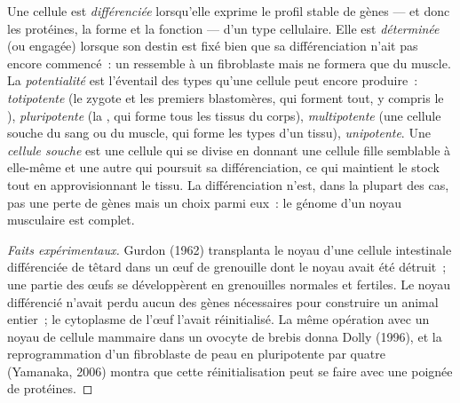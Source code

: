 \begin{definition}\label{def:b2:cell-differentiation:differentiation}
Une cellule est \emph{différenciée} lorsqu'elle exprime le profil stable
de gènes --- et donc les protéines, la forme et la fonction --- d'un type
cellulaire. Elle est \emph{déterminée} (ou engagée) lorsque son destin
est fixé bien que sa différenciation n'ait pas encore commencé~: un
 ressemble à un fibroblaste mais ne formera que du muscle. La
\emph{potentialité} est l'éventail des types qu'une cellule peut encore
produire~: \emph{totipotente} (le zygote et les premiers blastomères,
qui forment tout, y compris le ), \emph{pluripotente} (la , qui forme tous les tissus du corps),
\emph{multipotente} (une cellule souche du sang ou du muscle, qui forme
les types d'un tissu), \emph{unipotente}. Une \emph{cellule souche} est
une cellule qui se divise en donnant une cellule fille semblable à
elle-même et une autre qui poursuit sa différenciation, ce qui maintient
le stock tout en approvisionnant le tissu. La différenciation n'est,
dans la plupart des cas, pas une perte de gènes mais un choix parmi eux~:
le génome d'un noyau musculaire est complet.
\end{definition}
\begin{proof}[Faits expérimentaux]
Gurdon (1962) transplanta le noyau d'une cellule intestinale
différenciée de têtard dans un œuf de grenouille dont le noyau avait
été détruit~; une partie des œufs se développèrent en grenouilles
normales et fertiles. Le noyau différencié n'avait perdu aucun des
gènes nécessaires pour construire un animal entier~; le cytoplasme de
l'œuf l'avait réinitialisé. La même opération avec un noyau de cellule
mammaire dans un ovocyte de brebis donna Dolly (1996), et la
reprogrammation d'un fibroblaste de peau en  pluripotente
par quatre  (Yamanaka, 2006) montra que cette
réinitialisation peut se faire avec une poignée de protéines.
\end{proof}

